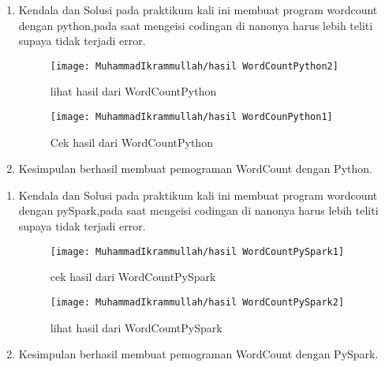 \begin{enumerate}
\item Kendala dan Solusi
\newline pada praktikum kali ini membuat program wordcount dengan python,pada saat mengeisi codingan di nanonya harus lebih teliti supaya tidak terjadi error.

\newpage
\begin{figure}[!ht]
\texttt{[image: MuhammadIkrammullah/hasil WordCountPython2]}
\caption{lihat hasil dari WordCountPython }
\label{gam:perkuliahan2-15}
\end{figure}

\begin{figure}[!ht]
\texttt{[image: MuhammadIkrammullah/hasil WordCounPython1]}
\caption{Cek hasil dari WordCountPython }
\label{gam:perkuliahan2-15}
\end{figure}

\item Kesimpulan
\newline berhasil membuat pemograman WordCount dengan Python.
\end{enumerate}

\begin{enumerate}
\item Kendala dan Solusi
\newline pada praktikum kali ini membuat program wordcount dengan pySpark,pada saat mengeisi codingan di nanonya harus lebih teliti supaya tidak terjadi error.

\begin{figure}[!ht]
\texttt{[image: MuhammadIkrammullah/hasil WordCountPySpark1]}
\caption{cek hasil dari WordCountPySpark }
\label{gam:perkuliahan2-15}
\end{figure}

\newpage
\begin{figure}[!ht]
\texttt{[image: MuhammadIkrammullah/hasil WordCountPySpark2]}
\caption{lihat hasil dari WordCountPySpark }
\label{gam:perkuliahan2-15}
\end{figure}

\item Kesimpulan
\newline berhasil membuat pemograman WordCount dengan PySpark.
\end{enumerate}

